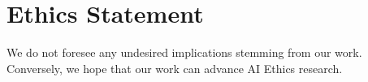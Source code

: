\section*{Ethics Statement}

We do not foresee any undesired implications stemming from our work. Conversely, we hope that our work can advance AI Ethics research.